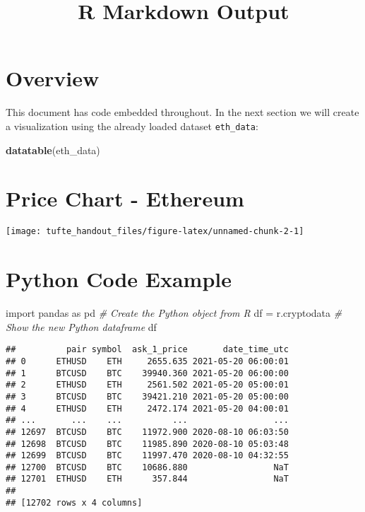 \documentclass[]{tufte-handout}
\title{R Markdown Output}
\date{}
\newenvironment{Shaded}{}{}
\newcommand{\CommentTok}[1]{\textcolor[rgb]{0.38,0.63,0.69}{\textit{#1}}}
\newcommand{\ImportTok}[1]{#1}
\newcommand{\KeywordTok}[1]{\textcolor[rgb]{0.00,0.44,0.13}{\textbf{#1}}}
\newcommand{\NormalTok}[1]{#1}
\newcommand{\OperatorTok}[1]{\textcolor[rgb]{0.40,0.40,0.40}{#1}}
\begin{document}
\maketitle




\hypertarget{overview}{%
\section{Overview}\label{overview}}

This document has code embedded throughout. In the next section we will
create a visualization using the already loaded dataset
\texttt{eth\_data}:

\begin{Shaded}
\begin{Highlighting}[]
\KeywordTok{datatable}\NormalTok{(eth_data)}
\end{Highlighting}
\end{Shaded}

\hypertarget{htmlwidget-44110e7a21a89119e94a}{}

\hypertarget{price-chart---ethereum}{%
\section{Price Chart - Ethereum}\label{price-chart---ethereum}}

\texttt{[image: tufte\_handout\_files/figure-latex/unnamed-chunk-2-1]}

\hypertarget{python-code-example}{%
\section{Python Code Example}\label{python-code-example}}

\begin{Shaded}
\begin{Highlighting}[]
\ImportTok{import}\NormalTok{ pandas }\ImportTok{as}\NormalTok{ pd}
\CommentTok{# Create the Python object from R}
\NormalTok{df }\OperatorTok{=}\NormalTok{ r.cryptodata}
\CommentTok{# Show the new Python dataframe}
\NormalTok{df}
\end{Highlighting}
\end{Shaded}

\begin{verbatim}
##          pair symbol  ask_1_price       date_time_utc
## 0      ETHUSD    ETH     2655.635 2021-05-20 06:00:01
## 1      BTCUSD    BTC    39940.360 2021-05-20 06:00:00
## 2      ETHUSD    ETH     2561.502 2021-05-20 05:00:01
## 3      BTCUSD    BTC    39421.210 2021-05-20 05:00:00
## 4      ETHUSD    ETH     2472.174 2021-05-20 04:00:01
## ...       ...    ...          ...                 ...
## 12697  BTCUSD    BTC    11972.900 2020-08-10 06:03:50
## 12698  BTCUSD    BTC    11985.890 2020-08-10 05:03:48
## 12699  BTCUSD    BTC    11997.470 2020-08-10 04:32:55
## 12700  BTCUSD    BTC    10686.880                 NaT
## 12701  ETHUSD    ETH      357.844                 NaT
## 
## [12702 rows x 4 columns]
\end{verbatim}
\end{document}
